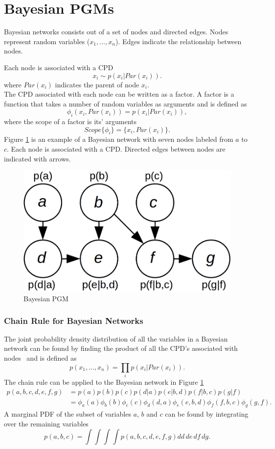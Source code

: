 \documentclass[12pt,oneside,openany,a4paper, %
afrikaans,english,
]{memoir}
\numberwithin{equation}{chapter}
\begin{document}
\section{Bayesian PGMs}
Bayesian networks consists out of a set of nodes and directed edges. Nodes represent random variables ($x_1, ..., x_n$). Edges indicate the relationship between nodes.

Each node is associated with a CPD
\begin{equation}
x_i \sim p(x_i|Par(x_i)).
\end{equation}
where $Par(x_i)$ indicates the parent of node $x_i$.\\
The CPD associated with each node can be written as a factor. A factor is a function that takes a number of random variables as arguments and is defined as
\begin{equation}
\phi_i(x_i, Par(x_i)) = p(x_i|Par(x_i)),
\end{equation}
where the scope of a factor is its' arguments
\begin{equation}
Scope\{\phi_i\} = \{x_i, Par(x_i)\}.
\end{equation}
Figure \ref{fig:bays_pgm} is an example of a Bayesian network with seven nodes labeled from $a$ to $c$. Each node is associated with a CPD. Directed edges between nodes are indicated with arrows.
\begin{figure}[H]
  \includegraphics[width=0.5\linewidth]{Figures/bayesian_pgm.png}
  \centering
  \caption{Bayesian PGM}
  \label{fig:bays_pgm}
\end{figure}
\subsubsection{Chain Rule for Bayesian Networks}
The joint probability density distribution of all the variables in a Bayesian network can be found by finding the product of all the CPD's associated with nodes~\citep{koller} and is defined as
\begin{equation}
p(x_1, ..., x_n) = \prod_i p(x_i|Par(x_i)).
\end{equation}
The chain rule can be applied to the Bayesian network in Figure \ref{fig:bays_pgm}
\begin{equation}
\begin{split}
p(a,b,c,d,e,f,g) & = p(a)p(b)p(c)p(d|a)p(e|b,d)p(f|b,c)p(g|f)\\
& = \phi_a(a)\phi_b(b)\phi_c(c)\phi_d(d,a)\phi_e(e,b,d)\phi_f(f,b,c)\phi_g(g,f).
\end{split}
\end{equation}
A marginal PDF of the subset of variables $a$, $b$ and $c$ can be found by integrating over the remaining variables
\begin{equation}
p(a,b,c) = \int\int\int\int p(a,b,c,d,e,f,g)dd\,de\,df\,dg.
\end{equation}
\end{document}
